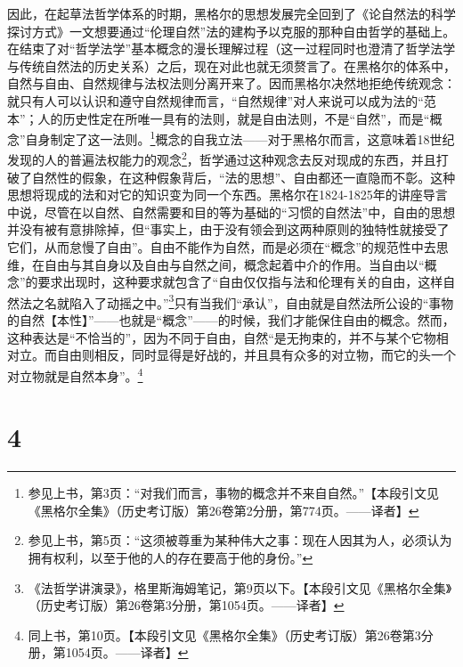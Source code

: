 因此，在起草法哲学体系的时期，黑格尔的思想发展完全回到了《论自然法的科学探讨方式》一文想要通过“伦理自然”法的建构予以克服的那种自由哲学的基础上。在结束了对“哲学法学”基本概念的漫长理解过程（这一过程同时也澄清了哲学法学与传统自然法的历史关系）之后，现在对此也就无须赘言了。在黑格尔的体系中，自然与自由、自然规律与法权法则分离开来了。因而黑格尔决然地拒绝传统观念：就只有人可以认识和遵守自然规律而言，“自然规律”对人来说可以成为法的“范本”；人的历史性定在所唯一具有的法则，就是自由法则，不是“自然”，而是“概念”自身制定了这一法则。\footnote{参见上书，第3页：“对我们而言，事物的概念并不来自自然。”【本段引文见《黑格尔全集》（历史考订版）第26卷第2分册，第774页。——译者】}概念的自我立法——对于黑格尔而言，这意味着18世纪发现的人的普遍法权能力的观念\footnote{参见上书，第5页：“这须被尊重为某种伟大之事：现在人因其为人，必须认为拥有权利，以至于他的人的存在要高于他的身份。”}，哲学通过这种观念去反对现成的东西，并且打破了自然性的假象，在这种假象背后，“法的思想”、自由都还一直隐而不彰。这种思想将现成的法和对它的知识变为同一个东西。黑格尔在1824-1825年的讲座导言中说，尽管在以自然、自然需要和目的等为基础的“习惯的自然法”中，自由的思想并没有被有意排除掉，但“事实上，由于没有领会到这两种原则的独特性就接受了它们，从而怠慢了自由”。自由不能作为自然，而是必须在“概念”的规范性中去思维，在自由与其自身以及自由与自然之间，概念起着中介的作用。当自由以“概念”的要求出现时，这种要求就包含了“自由仅仅指与法和伦理有关的自由，这样自然法之名就陷入了动摇之中。”\footnote{《法哲学讲演录》，格里斯海姆笔记，第9页以下。【本段引文见《黑格尔全集》（历史考订版）第26卷第3分册，第1054页。——译者】}只有当我们“承认”，自由就是自然法所公设的“事物的自然【本性】”——也就是“概念”——的时候，我们才能保住自由的概念。然而，这种表达是“不恰当的”，因为不同于自由，自然“是无拘束的，并不与某个它物相对立。而自由则相反，同时显得是好战的，并且具有众多的对立物，而它的头一个对立物就是自然本身”。\footnote{同上书，第10页。【本段引文见《黑格尔全集》（历史考订版）第26卷第3分册，第1054页。——译者】}

\section*{4}

